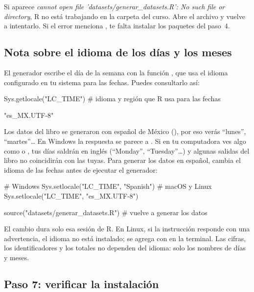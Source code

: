 \begin{advertencia}
Si aparece \textit{cannot open file 'datasets/generar\_datasets.R': No such
file or directory}, R no está trabajando en la carpeta del curso. Abre el
archivo  y vuelve a intentarlo. Si el error
menciona , te falta instalar los paquetes del paso~4.
\end{advertencia}

\subsection{Nota sobre el idioma de los días y los meses}

El generador escribe el día de la semana con la función
, que usa el idioma configurado en tu sistema para las
fechas. Puedes consultarlo así:

\begin{rcode}
Sys.getlocale("LC_TIME")   # idioma y región que R usa para las fechas
\end{rcode}

\begin{rsalida}
[1] "es_MX.UTF-8"
\end{rsalida}

Los datos del libro se generaron con español de México
(), por eso verás ``lunes'', ``martes''\ldots{} En
Windows la respuesta se parece a . Si en tu
computadora ves algo como  o
, tus días saldrán en inglés (``Monday'',
``Tuesday''\ldots) y algunas salidas del libro no coincidirán con las tuyas.
Para generar los datos en español, cambia el idioma de las fechas antes de
ejecutar el generador:

\begin{rnoejecutar}
# Windows
Sys.setlocale("LC_TIME", "Spanish")
# macOS y Linux
Sys.setlocale("LC_TIME", "es_MX.UTF-8")

source("datasets/generar_datasets.R")   # vuelve a generar los datos
\end{rnoejecutar}

El cambio dura solo esa sesión de R. En Linux, si la instrucción responde
con una advertencia, el idioma no está instalado; se agrega con
 en la terminal. Las cifras, los
identificadores y los totales no dependen del idioma: solo los nombres de
días y meses.

\subsection{Paso 7: verificar la instalación}

